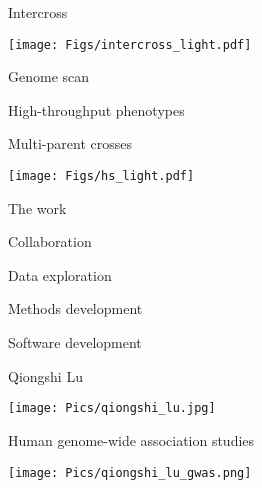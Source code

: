 \documentclass[12pt,t,aspectratio=169]{beamer}
\begin{document}
\begin{frame}{Intercross}

\centerline{
  \texttt{[image: Figs/intercross\_light.pdf]}
}

\end{frame}


\begin{frame}{Genome scan}



\end{frame}


\begin{frame}{High-throughput phenotypes}




\end{frame}


\begin{frame}{Multi-parent crosses}

\centerline{
  \texttt{[image: Figs/hs\_light.pdf]}
}


\end{frame}



\begin{frame}{The work}

    \bbi
  \item Collaboration
  \item Data exploration
  \item Methods development
  \item Software development
    \ei

\end{frame}



\begin{frame}{Qiongshi Lu}

\hspace*{0.85\textwidth}
\texttt{[image: Pics/qiongshi\_lu.jpg]}
\vspace*{-30mm}

{\large Human genome-wide association studies}

\bigskip

\texttt{[image: Pics/qiongshi\_lu\_gwas.png]}


\end{frame}
\end{document}
